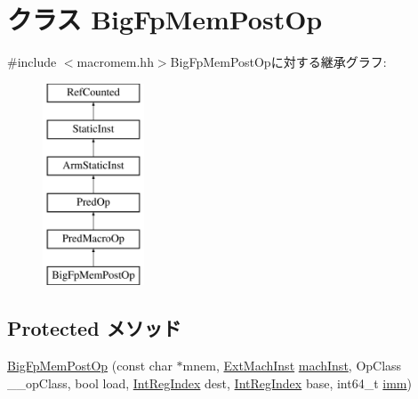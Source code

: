 \hypertarget{classArmISA_1_1BigFpMemPostOp}{
\section{クラス BigFpMemPostOp}
\label{classArmISA_1_1BigFpMemPostOp}
}


{\ttfamily \#include $<$macromem.hh$>$}BigFpMemPostOpに対する継承グラフ:\begin{figure}[H]
\begin{center}
\leavevmode
\includegraphics[height=6cm]{classArmISA_1_1BigFpMemPostOp}
\end{center}
\end{figure}
\subsection*{Protected メソッド}
\begin{DoxyCompactItemize}
\item 
\hyperlink{classArmISA_1_1BigFpMemPostOp_a9e2ec00bc8cb99dc7aeee6ec6f5e8148}{BigFpMemPostOp} (const char $\ast$mnem, \hyperlink{classStaticInst_a5605d4fc727eae9e595325c90c0ec108}{ExtMachInst} \hyperlink{classStaticInst_a744598b194ca3d4201d9414ce4cc4af4}{machInst}, OpClass \_\-\_\-opClass, bool load, \hyperlink{namespaceArmISA_ae64680ba9fb526106829d6bf92fc791b}{IntRegIndex} dest, \hyperlink{namespaceArmISA_ae64680ba9fb526106829d6bf92fc791b}{IntRegIndex} base, int64\_\-t \hyperlink{namespaceArmISA_a2308526fcc9af84548a72f9ba3102ec1}{imm})
\end{DoxyCompactItemize}


